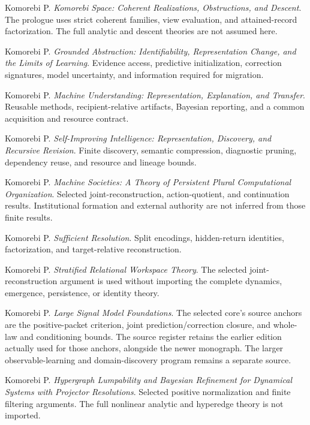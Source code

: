 \begin{description}[style=nextline]
\item[KS] Komorebi P. \emph{Komorebi Space: Coherent Realizations, Obstructions, and Descent}. The prologue uses strict coherent families, view evaluation, and attained-record factorization. The full analytic and descent theories are not assumed here.
\item[GA] Komorebi P. \emph{Grounded Abstraction: Identifiability, Representation Change, and the Limits of Learning}. Evidence access, predictive initialization, correction signatures, model uncertainty, and information required for migration.
\item[MU] Komorebi P. \emph{Machine Understanding: Representation, Explanation, and Transfer}. Reusable methods, recipient-relative artifacts, Bayesian reporting, and a common acquisition and resource contract.
\item[SII] Komorebi P. \emph{Self-Improving Intelligence: Representation, Discovery, and Recursive Revision}. Finite discovery, semantic compression, diagnostic pruning, dependency reuse, and resource and lineage bounds.
\item[MS] Komorebi P. \emph{Machine Societies: A Theory of Persistent Plural Computational Organization}. Selected joint-reconstruction, action-quotient, and continuation results. Institutional formation and external authority are not inferred from those finite results.
\item[SR] Komorebi P. \emph{Sufficient Resolution}. Split encodings, hidden-return identities, factorization, and target-relative reconstruction.
\item[SRWT] Komorebi P. \emph{Stratified Relational Workspace Theory}. The selected joint-reconstruction argument is used without importing the complete dynamics, emergence, persistence, or identity theory.
\item[LSM] Komorebi P. \emph{Large Signal Model Foundations}. The selected core's source anchors are the positive-packet criterion, joint prediction/correction closure, and whole-law and conditioning bounds. The source register retains the earlier edition actually used for those anchors, alongside the newer monograph. The larger observable-learning and domain-discovery program remains a separate source.
\item[PRIQ] Komorebi P. \emph{Hypergraph Lumpability and Bayesian Refinement for Dynamical Systems with Projector Resolutions}. Selected positive normalization and finite filtering arguments. The full nonlinear analytic and hyperedge theory is not imported.

\end{description}
